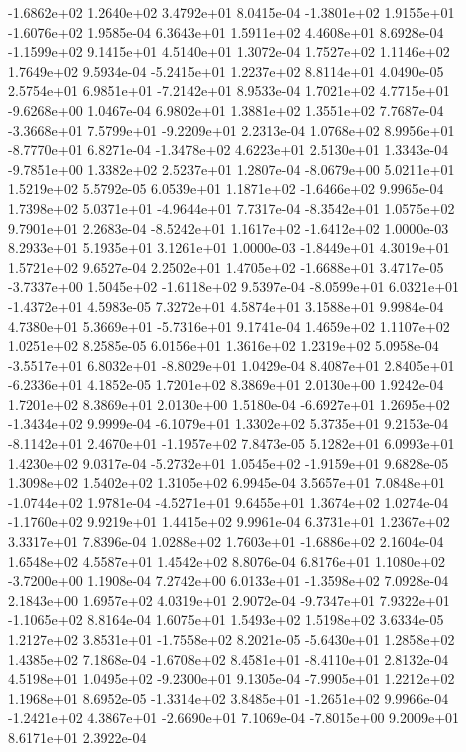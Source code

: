 -1.6862e+02  1.2640e+02  3.4792e+01  8.0415e-04
-1.3801e+02  1.9155e+01 -1.6076e+02  1.9585e-04
6.3643e+01 1.5911e+02 4.4608e+01  8.6928e-04
-1.1599e+02  9.1415e+01  4.5140e+01  1.3072e-04
1.7527e+02 1.1146e+02 1.7649e+02  9.5934e-04
-5.2415e+01  1.2237e+02  8.8114e+01  4.0490e-05
 2.5754e+01  6.9851e+01 -7.2142e+01  8.9533e-04
 1.7021e+02  4.7715e+01 -9.6268e+00  1.0467e-04
6.9802e+01 1.3881e+02 1.3551e+02  7.7687e-04
-3.3668e+01  7.5799e+01 -9.2209e+01  2.2313e-04
 1.0768e+02  8.9956e+01 -8.7770e+01  6.8271e-04
-1.3478e+02  4.6223e+01  2.5130e+01  1.3343e-04
-9.7851e+00  1.3382e+02  2.5237e+01  1.2807e-04
-8.0679e+00  5.0211e+01  1.5219e+02  5.5792e-05
 6.0539e+01  1.1871e+02 -1.6466e+02  9.9965e-04
 1.7398e+02  5.0371e+01 -4.9644e+01  7.7317e-04
-8.3542e+01  1.0575e+02  9.7901e+01  2.2683e-04
-8.5242e+01  1.1617e+02 -1.6412e+02  1.0000e-03
8.2933e+01 5.1935e+01 3.1261e+01  1.0000e-03
-1.8449e+01  4.3019e+01  1.5721e+02  9.6527e-04
 2.2502e+01  1.4705e+02 -1.6688e+01  3.4717e-05
-3.7337e+00  1.5045e+02 -1.6118e+02  9.5397e-04
-8.0599e+01  6.0321e+01 -1.4372e+01  4.5983e-05
7.3272e+01 4.5874e+01 3.1588e+01  9.9984e-04
 4.7380e+01  5.3669e+01 -5.7316e+01  9.1741e-04
1.4659e+02 1.1107e+02 1.0251e+02  8.2585e-05
6.0156e+01 1.3616e+02 1.2319e+02  5.0958e-04
-3.5517e+01  6.8032e+01 -8.8029e+01  1.0429e-04
 8.4087e+01  2.8405e+01 -6.2336e+01  4.1852e-05
1.7201e+02 8.3869e+01 2.0130e+00  1.9242e-04
1.7201e+02 8.3869e+01 2.0130e+00  1.5180e-04
-6.6927e+01  1.2695e+02 -1.3434e+02  9.9999e-04
-6.1079e+01  1.3302e+02  5.3735e+01  9.2153e-04
-8.1142e+01  2.4670e+01 -1.1957e+02  7.8473e-05
5.1282e+01 6.0993e+01 1.4230e+02  9.0317e-04
-5.2732e+01  1.0545e+02 -1.9159e+01  9.6828e-05
1.3098e+02 1.5402e+02 1.3105e+02  6.9945e-04
 3.5657e+01  7.0848e+01 -1.0744e+02  1.9781e-04
-4.5271e+01  9.6455e+01  1.3674e+02  1.0274e-04
-1.1760e+02  9.9219e+01  1.4415e+02  9.9961e-04
6.3731e+01 1.2367e+02 3.3317e+01  7.8396e-04
 1.0288e+02  1.7603e+01 -1.6886e+02  2.1604e-04
1.6548e+02 4.5587e+01 1.4542e+02  8.8076e-04
 6.8176e+01  1.1080e+02 -3.7200e+00  1.1908e-04
 7.2742e+00  6.0133e+01 -1.3598e+02  7.0928e-04
2.1843e+00 1.6957e+02 4.0319e+01  2.9072e-04
-9.7347e+01  7.9322e+01 -1.1065e+02  8.8164e-04
1.6075e+01 1.5493e+02 1.5198e+02  3.6334e-05
 1.2127e+02  3.8531e+01 -1.7558e+02  8.2021e-05
-5.6430e+01  1.2858e+02  1.4385e+02  7.1868e-04
-1.6708e+02  8.4581e+01 -8.4110e+01  2.8132e-04
 4.5198e+01  1.0495e+02 -9.2300e+01  9.1305e-04
-7.9905e+01  1.2212e+02  1.1968e+01  8.6952e-05
-1.3314e+02  3.8485e+01 -1.2651e+02  9.9966e-04
-1.2421e+02  4.3867e+01 -2.6690e+01  7.1069e-04
-7.8015e+00  9.2009e+01  8.6171e+01  2.3922e-04
